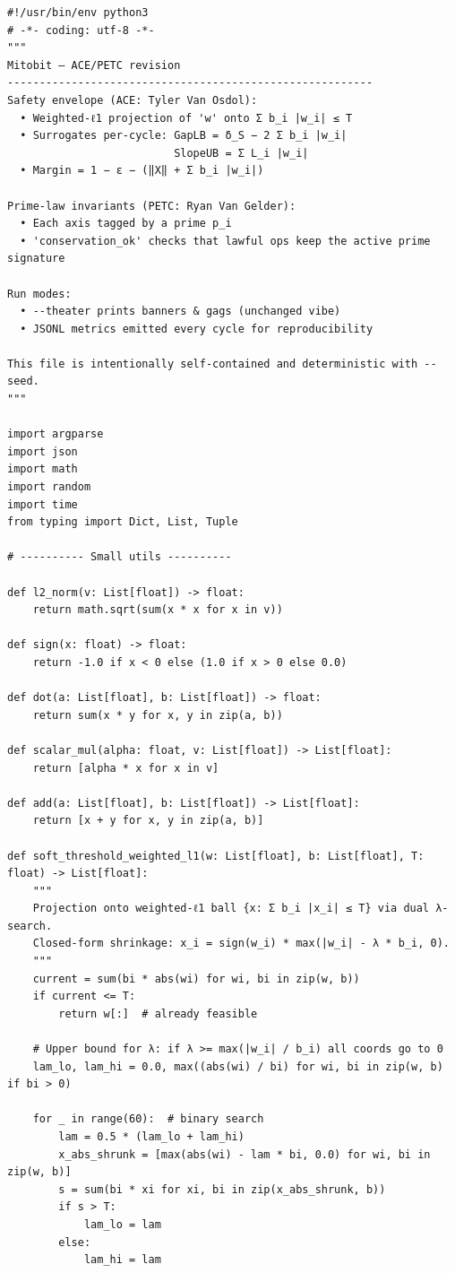 \documentclass[11pt]{article}
\begin{document}
\begin{lstlisting}[style=py,caption={Mitobit (ACE/PETC revision). Self-contained script with weighted-$\ell_1$ projection, ACE surrogates, and PETC prime-lawfulness.},label={lst:code}]
#!/usr/bin/env python3
# -*- coding: utf-8 -*-
"""
Mitobit — ACE/PETC revision
---------------------------------------------------------
Safety envelope (ACE: Tyler Van Osdol):
  • Weighted-ℓ1 projection of 'w' onto Σ b_i |w_i| ≤ T
  • Surrogates per-cycle: GapLB = δ_S − 2 Σ b_i |w_i|
                          SlopeUB = Σ L_i |w_i|
  • Margin = 1 − ε − (‖X‖ + Σ b_i |w_i|)

Prime-law invariants (PETC: Ryan Van Gelder):
  • Each axis tagged by a prime p_i
  • 'conservation_ok' checks that lawful ops keep the active prime signature

Run modes:
  • --theater prints banners & gags (unchanged vibe)
  • JSONL metrics emitted every cycle for reproducibility

This file is intentionally self-contained and deterministic with --seed.
"""

import argparse
import json
import math
import random
import time
from typing import Dict, List, Tuple

# ---------- Small utils ----------

def l2_norm(v: List[float]) -> float:
    return math.sqrt(sum(x * x for x in v))

def sign(x: float) -> float:
    return -1.0 if x < 0 else (1.0 if x > 0 else 0.0)

def dot(a: List[float], b: List[float]) -> float:
    return sum(x * y for x, y in zip(a, b))

def scalar_mul(alpha: float, v: List[float]) -> List[float]:
    return [alpha * x for x in v]

def add(a: List[float], b: List[float]) -> List[float]:
    return [x + y for x, y in zip(a, b)]

def soft_threshold_weighted_l1(w: List[float], b: List[float], T: float) -> List[float]:
    """
    Projection onto weighted-ℓ1 ball {x: Σ b_i |x_i| ≤ T} via dual λ-search.
    Closed-form shrinkage: x_i = sign(w_i) * max(|w_i| - λ * b_i, 0).
    """
    current = sum(bi * abs(wi) for wi, bi in zip(w, b))
    if current <= T:
        return w[:]  # already feasible

    # Upper bound for λ: if λ >= max(|w_i| / b_i) all coords go to 0
    lam_lo, lam_hi = 0.0, max((abs(wi) / bi) for wi, bi in zip(w, b) if bi > 0)

    for _ in range(60):  # binary search
        lam = 0.5 * (lam_lo + lam_hi)
        x_abs_shrunk = [max(abs(wi) - lam * bi, 0.0) for wi, bi in zip(w, b)]
        s = sum(bi * xi for xi, bi in zip(x_abs_shrunk, b))
        if s > T:
            lam_lo = lam
        else:
            lam_hi = lam


\end{lstlisting}
\end{document}
